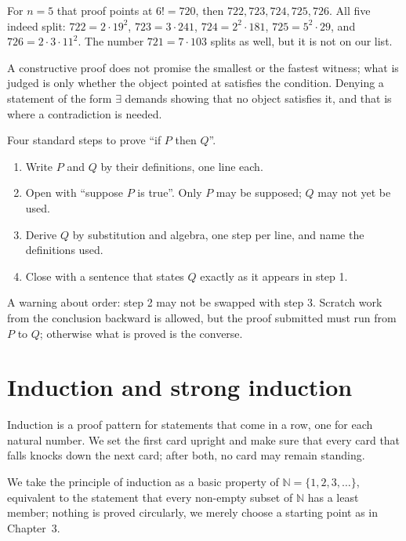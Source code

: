 For $n = 5$ that proof points at $6! = 720$, then $722, 723, 724, 725, 726$. All five
indeed split: $722 = 2 \cdot 19^{2}$, $723 = 3 \cdot 241$, $724 = 2^{2} \cdot 181$,
$725 = 5^{2} \cdot 29$, and $726 = 2 \cdot 3 \cdot 11^{2}$. The number $721 = 7 \cdot 103$ splits as well, but it is not on our list.

A constructive proof does not promise the smallest or the fastest witness; what is judged is only
whether the object pointed at satisfies the condition. Denying a statement of the form $\exists$
demands showing that no object satisfies it, and that is where a contradiction
is needed.

\begin{resep}
Four standard steps to prove ``if $P$ then $Q$''.
\begin{enumerate}
  \item Write $P$ and $Q$ by their definitions, one line each.
  \item Open with ``suppose $P$ is true''. Only $P$ may be supposed; $Q$ may not
        yet be used.
  \item Derive $Q$ by substitution and algebra, one step per line, and name
        the definitions used.
  \item Close with a sentence that states $Q$ exactly as it appears in step 1.
\end{enumerate}
A warning about order: step 2 may not be swapped with step 3. Scratch work from the conclusion
backward is allowed, but the proof submitted must run from $P$ to $Q$; otherwise
what is proved is the converse.
\end{resep}
\section{Induction and strong induction}

Induction is a proof pattern for statements that come in a row, one for each natural
number. We set the first card upright and make sure that every card that falls knocks down
the next card; after both, no card may remain standing.


We take the principle of induction as a basic property of $\mathbb{N} = \{1,2,3,\dots\}$, equivalent
to the statement that every non-empty subset of $\mathbb{N}$ has a
least member; nothing is proved circularly, we merely choose a starting point as in Chapter~3.

